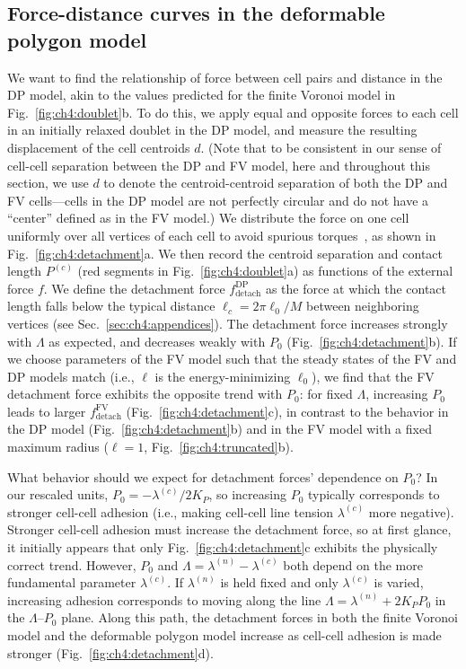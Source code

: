 \subsection{Force-distance curves in the deformable polygon model}


We want to find the relationship of force between cell pairs and distance in the DP model, akin to the values predicted for the finite Voronoi model in Fig.~\ref{fig:ch4:doublet}b. To do this, we apply equal and opposite forces to each cell in an initially relaxed doublet in the DP model, and measure the resulting displacement of the cell centroids $d$. (Note that to be consistent in our sense of cell-cell separation between the DP and FV model, here and throughout this section, we use $d$ to denote the centroid-centroid separation of both the DP and FV cells---cells in the DP model are not perfectly circular and do not have a ``center'' defined as in the FV model.)
We distribute the force on one cell uniformly over all vertices of each cell to avoid spurious torques~\cite{smeets2019effect}, as shown in Fig.~\ref{fig:ch4:detachment}a.
We then record the centroid separation and contact length $P^{(c)}$ (red segments in Fig.~\ref{fig:ch4:doublet}a) as functions of the external force $f$. We define the detachment force $f_{\textrm{detach}}^\textrm{DP}$ as the force at which the contact length falls below the typical distance $\ell_c=2\pi\ell_0/M$ between neighboring vertices (see Sec.~\ref{sec:ch4:appendices}).
The detachment force increases strongly with $\Lambda$ as expected, and decreases weakly with $P_0$ (Fig.~\ref{fig:ch4:detachment}b).
If we choose parameters of the FV model such that the steady states of the FV and DP models match (i.e., $\ell$ is the energy-minimizing $\ell_0$), we find that the FV detachment force exhibits the opposite trend with $P_0$: for fixed $\Lambda$, increasing $P_0$ leads to larger $f_\textrm{detach}^\textrm{FV}$ (Fig.~\ref{fig:ch4:detachment}c), in contrast to the behavior in the DP model (Fig.~\ref{fig:ch4:detachment}b) and in the FV model with a fixed maximum radius ($\ell=1$, Fig.~\ref{fig:ch4:truncated}b).

What behavior should we expect for detachment forces' dependence on $P_0$? In our rescaled units, $P_0=-\lambda^{(c)}/2K_P$, so increasing $P_0$ typically corresponds to stronger cell-cell adhesion (i.e., making cell-cell line tension $\lambda^{(c)}$ more negative). Stronger cell-cell adhesion must increase the detachment force, so at first glance, it initially appears that only Fig.~\ref{fig:ch4:detachment}c exhibits the physically correct trend.
However, $P_0$ and $\Lambda=\lambda^{(n)}-\lambda^{(c)}$ both depend on the more fundamental parameter $\lambda^{(c)}$.
If $\lambda^{(n)}$ is held fixed and only $\lambda^{(c)}$ is varied, increasing adhesion corresponds to moving along the line $\Lambda=\lambda^{(n)}+2K_P P_0$ in the $\Lambda$--$P_0$ plane.
Along this path, the detachment forces in both the finite Voronoi model and the deformable polygon model increase as cell-cell adhesion is made stronger (Fig.~\ref{fig:ch4:detachment}d).

